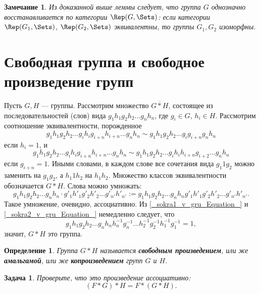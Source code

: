 \documentclass[12pt]{book}
\theoremstyle{upshape}
\newtheorem{zadacha}{Задача}[chapter]
\theoremstyle{generic}
\newtheorem{opredelenie}[teorema]{Определение}
\newtheorem{remark}[teorema]{Замечание}
\def\замечание{\begin{remark}}
\def\еза{\end{remark}}
\theoremstyle{upshapenonumber}
\newcommand{\следствие}{%
     \refstepcounter{teorema}
     {\noindent\bf Следствие \thechapter.\arabic{teorema}:\ }}
\newcommand{\пример}{%
     \refstepcounter{teorema}
     {\noindent\bf Пример \thechapter.\arabic{teorema}:\ }}
\newcommand{\лемма}{%
     \refstepcounter{teorema}
     {\noindent\bf Лемма \thechapter.\arabic{teorema}:\ }}
\newcommand{\теорема}{%
     \refstepcounter{teorema}
     {\noindent\bf Теорема \thechapter.\arabic{teorema}:\ }}
\newcommand{\утверждение}{%
     \refstepcounter{teorema}
     {\noindent\bf Утверждение \thechapter.\arabic{teorema}:\ }}
\def\бф{\bf}
\def\ем{\em}
\def\задача{\begin{zadacha}}
\def\ез{\end{zadacha}}
\def\еу{\end{ukazanie}}
\def\определение{\begin{opredelenie}}
\def\ео{\end{opredelenie}}
\def\енум{\begin{enumerate}}
\def\ее{\end{enumerate}}
\begin{document}
\замечание\label{_vosst_G_iz_Rep_Zamechanie_}
Из доказанной выше леммы следует, что группа $G$ однозначно
восстанавливается по категории $\Rep(G, \Sets)$: если
категории $\Rep(G_1, \Sets)$, $\Rep(G_2, \Sets)$
эквивалентны, то группы $G_1, G_2$ изоморфны.
\еза


\section{Свободная группа и свободное произведение групп}

Пусть $G, H$ --- группы. Рассмотрим множество $\overline{G*H}$,
состоящее из последовательностей (слов) вида
$g_1h_1g_2h_2...g_nh_n$, где $g_i\in G$, $h_i\in H$.
Рассмотрим соотношение эквивалентности, порожденное
\begin{equation}\label{_sokra1_v_gru_Equation_}
g_1h_1g_2h_2...g_i h_i g_{i+n}h_{i+n} ... g_nh_n \sim 
g_1h_1g_2h_2... g_i  g_{i+n} g_nh_n
\end{equation}
если $h_i=1$, и 
\begin{equation}\label{_sokra2_v_gru_Equation_}
g_1h_1g_2h_2...g_i h_i g_{i+n}h_{i+n} ... g_nh_n \sim 
g_1h_1g_2h_2... g_i h_ih_{i+n} g_{i+2}...   g_nh_n
\end{equation}
если $g_{i+n}=1$. Иными словами, в каждом слове
все сочетания вида $g_1 1 g_2$ можно заменить на
$g_1g_2$, а $h_1 1 h_2$  на $h_1h_2$.
Множество классов эквивалентности обозначается $G*H$.
Слова можно умножать:
\[
g_1h_1g_2h_2...g_nh_n \cdot
g'_1h'_1g'_2h'_2...g'_{n'}h'_{n'}:=g_1h_1g_2h_2...g_nh_ng'_1h'_1g'_2h'_2...g'_{n'}h'_{n'}.
\]
Такое умножение, очевидно, ассоциативно.
Из \eqref{_sokra1_v_gru_Equation_} и \eqref{_sokra2_v_gru_Equation_}
немедленно следует, что 
\[ 
  g_1h_1g_2h_2...g_nh_nh_n^{-1}
  g_n^{-1}... h_2^{-1}g_2^{-1}h_1^{-1}g_1^{-1}=1,
\]
значит, $G*H$ это группа.

\определение
Группа $G*H$ называется {\бф свободным произведением},
или же {\бф амальгамой}, или же {\бф копроизведением} групп
$G$ и $H$.
\ео

\задача
Проверьте, что это произведение ассоциативно:
\[
(F*G)*H=F*(G*H).
\]
\ез
\end{document}
